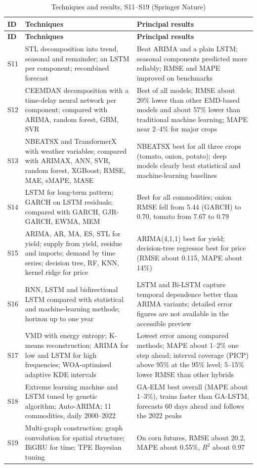 {\footnotesize\setlength{\tabcolsep}{4pt}\renewcommand{\arraystretch}{1.15}
\begin{longtable}{|p{0.9cm}|p{5.8cm}|p{9.2cm}|}
\caption{Techniques and results, S11--S19 (Springer Nature)}\label{tab:survey-t2}\\
\hline \textbf{ID} & \textbf{Techniques} & \textbf{Principal results} \\ \hline \endfirsthead
\hline \textbf{ID} & \textbf{Techniques} & \textbf{Principal results} \\ \hline \endhead
\hline \endfoot
S11 & STL decomposition into trend, seasonal and remainder; an LSTM per component; recombined forecast & Beat ARIMA and a plain LSTM; seasonal components predicted more reliably; RMSE and MAPE improved on benchmarks \\ \hline
S12 & CEEMDAN decomposition with a time-delay neural network per component; compared with ARIMA, random forest, GBM, SVR & Best of all models; RMSE about 20\% lower than other EMD-based models and about 57\% lower than traditional machine learning; MAPE near 2--4\% for major crops \\ \hline
S13 & NBEATSX and TransformerX with weather variables; compared with ARIMAX, ANN, SVR, random forest, XGBoost; RMSE, MAE, sMAPE, MASE & NBEATSX best for all three crops (tomato, onion, potato); deep models clearly beat statistical and machine-learning baselines \\ \hline
S14 & LSTM for long-term pattern; GARCH on LSTM residuals; compared with GARCH, GJR-GARCH, EWMA, MEM & Best for all commodities; onion RMSE fell from 5.44 (GARCH) to 0.70, tomato from 7.67 to 0.79 \\ \hline
S15 & ARIMA, AR, MA, ES, STL for yield; supply from yield, residue and imports; demand by time series; decision tree, RF, KNN, kernel ridge for price & ARIMA(4,1,1) best for yield; decision-tree regressor best for price (RMSE about 0.115, MAPE about 14\%) \\ \hline
S16 & RNN, LSTM and bidirectional LSTM compared with statistical and machine-learning methods; horizon up to one year & LSTM and Bi-LSTM capture temporal dependence better than ARIMA variants; detailed error figures are not available in the accessible preview \\ \hline
S17 & VMD with energy entropy; K-means reconstruction; ARIMA for low and LSTM for high frequencies; WOA-optimised adaptive KDE intervals & Lowest error among compared methods; MAPE about 1--2\% one step ahead; interval coverage (PICP) above 95\% at the 95\% level; 5--15\% lower RMSE than other hybrids \\ \hline
S18 & Extreme learning machine and LSTM tuned by genetic algorithm; Auto-ARIMA; 11 commodities, daily 2000--2022 & GA-ELM best overall (MAPE about 1--3\%), trains faster than GA-LSTM, forecasts 60 days ahead and follows the 2022 peaks \\ \hline
S19 & Multi-graph construction; graph convolution for spatial structure; BiGRU for time; TPE Bayesian tuning & On corn futures, RMSE about 20.2, MAPE about 0.55\%, $R^2$ about 0.97 \\ \hline
\end{longtable}}

